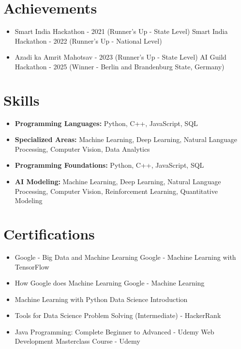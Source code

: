 \documentclass[a4paper,10pt]{article}
\begin{document}
\section*{Achievements}
\begin{itemize}
\item Smart India Hackathon - 2021 (Runner's Up - State Level) \hfill Smart India Hackathon - 2022 (Runner's Up - National Level)
\item Azadi ka Amrit Mahotsav - 2023 (Runner's Up - State Level) \hfill AI Guild Hackathon - 2025 (Winner - Berlin and Brandenburg State, Germany)
\end{itemize}

\section*{Skills}
\begin{itemize}
  \item \textbf{Programming Languages:} Python, C++, JavaScript, SQL
  \item \textbf{Specialized Areas:} Machine Learning, Deep Learning, Natural Language Processing, Computer Vision, Data Analytics
  \item \textbf{Programming Foundations:} Python, C++, JavaScript, SQL
  \item \textbf{AI Modeling:} Machine Learning, Deep Learning, Natural Language Processing, Computer Vision, Reinforcement Learning, Quantitative Modeling
\end{itemize}

\section*{Certifications}
\begin{itemize}
\item Google - Big Data and Machine Learning \hfill Google - Machine Learning with TensorFlow
\item How Google does Machine Learning \hfill Google - Machine Learning
\item Machine Learning with Python \hfill Data Science Introduction
\item Tools for Data Science \hfill Problem Solving (Intermediate) - HackerRank
\item Java Programming: Complete Beginner to Advanced - Udemy \hfill Web Development Masterclass Course - Udemy
\end{itemize}
\end{document}
